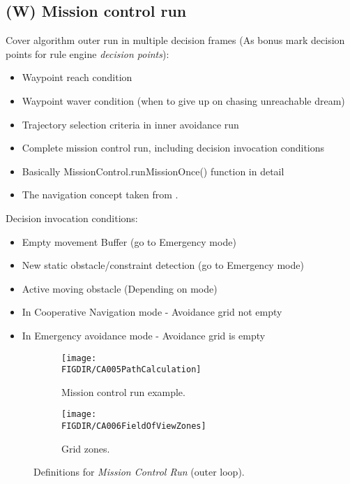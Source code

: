 \subsection{(W) Mission control run}\label{s:missionControlRun}
    \noindent Cover algorithm outer run in multiple decision frames (As bonus mark decision points for rule engine \emph{decision points}):
    \begin{itemize}
        \item Waypoint reach condition
        \item Waypoint waver condition (when to give up on chasing unreachable dream)
        \item Trajectory selection criteria in inner avoidance run
        \item Complete mission control run, including decision invocation conditions
        \item Basically MissionControl.runMissionOnce() function in detail
		\item The navigation concept taken from \cite{sabatini2014navigation,Sabatini2014}.
    \end{itemize}
    \noindent Decision invocation conditions:
    \begin{itemize}
        \item Empty movement Buffer (go to Emergency mode)
        \item New static obstacle/constraint detection (go to Emergency mode)
        \item Active moving obstacle (Depending on mode)
        \item In Cooperative Navigation mode - Avoidance grid not empty
        \item In Emergency avoidance mode - Avoidance grid is empty
    \end{itemize}
    \begin{figure}[H]
	    \centering
        \begin{subfigure}{0.48\textwidth}
            \texttt{[image: \\FIGDIR/CA005PathCalculation]}
            \caption{Mission control run example.}
            \label{fig:missionControlRunExample}
        \end{subfigure}
        \begin{subfigure}{0.48\textwidth}
            \texttt{[image: \\FIGDIR/CA006FieldOfViewZones]} 
            \caption{Grid zones.}
            \label{fig:gridZonesMissionControl}
        \end{subfigure}
        \caption{Definitions for \emph{Mission Control Run} (outer loop).}
        \label{fig:definitionsForMissionControlRun}
    \end{figure}
    
